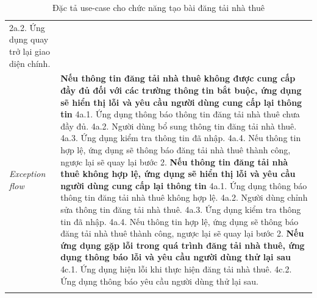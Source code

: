 \begin{center}
\begin{longtable}{
        |>{\raggedright\arraybackslash}p{3cm}
        |>{\raggedright\arraybackslash}p{13cm}
        |}
        2a.2. Ứng dụng quay trở lại giao diện chính.
        \\\hdashline
        \rowcolor{cyan!10!white} \textit{Exception flow} & 
        \textbf{Nếu thông tin đăng tải nhà thuê không được cung cấp đầy đủ đối với các trường thông tin bắt buộc, ứng dụng sẽ hiển thị lỗi và yêu cầu người dùng cung cấp lại thông tin} \newline
        4a.1. Ứng dụng thông báo thông tin đăng tải nhà thuê chưa đầy đủ. \newline
        4a.2. Người dùng bổ sung thông tin đăng tải nhà thuê. \newline
        4a.3. Ứng dụng kiểm tra thông tin đã nhập. \newline
        4a.4. Nếu thông tin hợp lệ, ứng dụng sẽ thông báo đăng tải nhà thuê thành công, ngược lại sẽ quay lại bước 2. \newline
        \textbf{Nếu thông tin đăng tải nhà thuê không hợp lệ, ứng dụng sẽ hiển thị lỗi và yêu cầu người dùng cung cấp lại thông tin} \newline
        4a.1. Ứng dụng thông báo thông tin đăng tải nhà thuê không hợp lệ. \newline
        4a.2. Người dùng chỉnh sửa thông tin đăng tải nhà thuê. \newline
        4a.3. Ứng dụng kiểm tra thông tin đã nhập. \newline
        4a.4. Nếu thông tin hợp lệ, ứng dụng sẽ thông báo đăng tải nhà thuê thành công, ngược lại sẽ quay lại bước 2. \newline
        \textbf{Nếu ứng dụng gặp lỗi trong quá trình đăng tải nhà thuê, ứng dụng thông báo lỗi và yêu cầu người dùng thử lại sau} \newline
        4c.1. Ứng dụng hiện lỗi khi thực hiện đăng tải nhà thuê. \newline
        4c.2. Ứng dụng thông báo yêu cầu người dùng thử lại sau.
        \\\hline
        \caption{Đặc tả use-case cho chức năng tạo bài đăng tải nhà thuê}
    \end{longtable}
\end{center}

